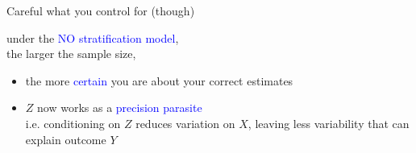 %
%
\begin{lhframe}[rhgraphic={\texttt{[image: pipefork1\_samplesize2.pdf]}}]
	{Careful what you control for (though)}
	
	under the \textcolor{blue}{NO stratification model}, \\
	the larger the sample size,
	\begin{itemize}
		\item the more \textcolor{blue}{certain} you are about your \alert{correct} estimates
		\item $Z$ now works as a \textcolor{blue}{precision parasite} \\
		{\small i.e. conditioning on $Z$ reduces variation on $X$, leaving less variability that can explain outcome $Y$}
	\end{itemize}
\end{lhframe}
%
%
